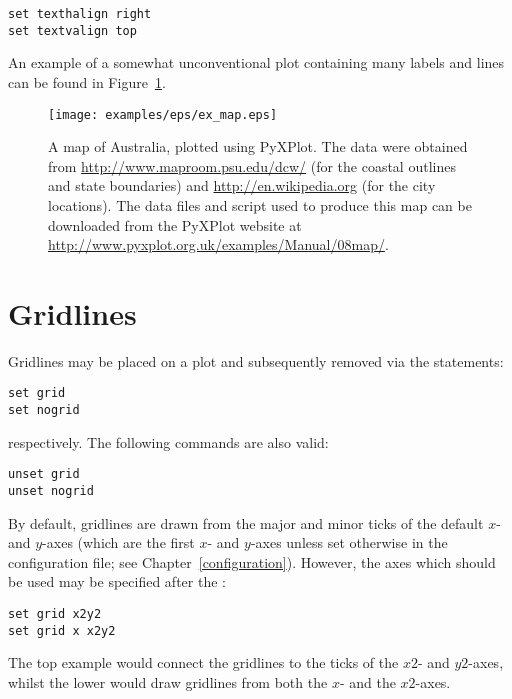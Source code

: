 \begin{verbatim}
set texthalign right
set textvalign top
\end{verbatim}

An example of a somewhat unconventional plot containing many labels and lines can be found in Figure~\ref{fig:ex_map}.

\begin{figure}
\begin{center}
\texttt{[image: examples/eps/ex\_map.eps]}
\end{center}
\caption[A map of Australia, plotted using PyXPlot]
{A map of Australia, plotted using PyXPlot.  The data were obtained
from \protect\url{http://www.maproom.psu.edu/dcw/} (for the coastal outlines
and state boundaries) and \protect\url{http://en.wikipedia.org} (for the city
locations).  The data files and script used to produce this map can be
downloaded from the PyXPlot website at
\protect\url{http://www.pyxplot.org.uk/examples/Manual/08map/}.}
\label{fig:ex_map}
\end{figure}

\section{Gridlines}

Gridlines may be placed on a plot and subsequently removed via the statements:

\begin{verbatim}
set grid
set nogrid
\end{verbatim}

\noindent respectively. The following commands are also valid:

\begin{verbatim}
unset grid
unset nogrid
\end{verbatim}

\noindent By default, gridlines are drawn from the major and minor ticks of the
default $x$- and $y$-axes (which are the first $x$- and $y$-axes unless set
otherwise in the configuration file; see Chapter~\ref{configuration}). However,
the axes which should be used may be specified after the :

\begin{verbatim}
set grid x2y2
set grid x x2y2
\end{verbatim}

\noindent The top example would connect the gridlines to the ticks of the $x2$-
and $y2$-axes, whilst the lower would draw gridlines from both the $x$- and the
$x2$-axes.

